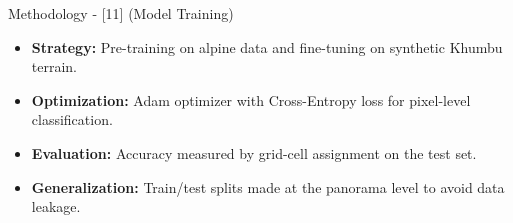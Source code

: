 \begin{frame}{Methodology - [11] (Model Training)}
    \begin{itemize}
        \item \textbf{Strategy:} Pre-training on alpine data and fine-tuning on synthetic Khumbu terrain.
        \item \textbf{Optimization:} Adam optimizer with Cross-Entropy loss for pixel-level classification.
        \item \textbf{Evaluation:} Accuracy measured by grid-cell assignment on the test set.
        \item \textbf{Generalization:} Train/test splits made at the panorama level to avoid data leakage.
    \end{itemize}
\end{frame}